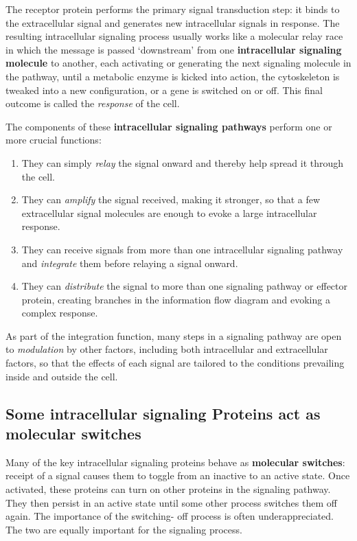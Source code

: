 The receptor protein performs the primary signal transduction step: it
binds to the extracellular signal and generates new intracellular signals
in response. The resulting intracellular signaling process 
usually works like a molecular relay race in which the message
is passed ‘downstream’ from one \textbf{intracellular signaling molecule} to
another, each activating or generating the next signaling molecule in the
pathway, until a metabolic enzyme is kicked into action, the cytoskeleton
is tweaked into a new configuration, or a gene is switched on or off. This
final outcome is called the \textit{response} of the cell.

The components of these \textbf{intracellular signaling pathways} perform one
or more crucial functions:

\begin{enumerate}
\item They can simply \textit{relay} the signal onward and thereby help spread it
through the cell.
\item They can \textit{amplify} the signal received, making it stronger, so that
a few extracellular signal molecules are enough to evoke a large
intracellular response.
\item They can receive signals from more than one intracellular signaling
pathway and \textit{integrate} them before relaying a signal onward.
\item They can \textit{distribute} the signal to more than one signaling pathway or
effector protein, creating branches in the information flow diagram
and evoking a complex response.
\end{enumerate}

As part of the integration function, many steps in a signaling pathway
are open to \textit{modulation} by other factors, including both intracellular and
extracellular factors, so that the effects of each signal are tailored to the
conditions prevailing inside and outside the cell.

\subsection{Some intracellular signaling Proteins act as molecular switches}

Many of the key intracellular signaling proteins behave as \textbf{molecular
switches}: receipt of a signal causes them to toggle from an inactive to
an active state. Once activated, these proteins can turn on other proteins
in the signaling pathway. They then persist in an active state until some
other process switches them off again. The importance of the switching-
off process is often underappreciated. The two are equally important for the
signaling process.

